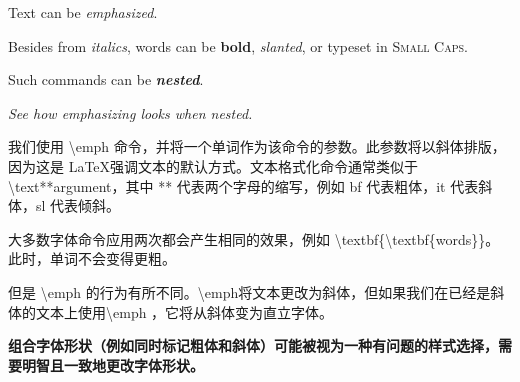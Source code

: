 \documentclass{article}
\begin{document}
Text can be \emph{emphasized}.

Besides from \textit{italics}, words can be \textbf{bold}, \textsl{slanted}, or typeset in \textsc {Small Caps}.

Such commands can be \textit{\textbf{nested}}.

\emph{See how \emph{emphasizing} looks when nested.}

我们使用 \textbackslash emph 命令，并将一个单词作为该命令的参数。此参数将以斜体排版，因为这是 \LaTeX 强调文本的默认方式。文本格式化命令通常类似于\textbackslash text**{argument}，其中 ** 代表两个字母的缩写，例如 bf 代表粗体，it 代表斜体，sl 代表倾斜。

大多数字体命令应用两次都会产生相同的效果，例如 \textbackslash textbf\{\textbackslash textbf\{words\}\}。此时，单词不会变得更粗。

但是 \textbackslash emph 的行为有所不同。\textbackslash emph将文本更改为斜体，但如果我们在已经是斜体的文本上使用\textbackslash emph ，它将从斜体变为直立字体。

\textbf{组合字体形状（例如同时标记粗体和斜体）可能被视为一种有问题的样式选择，需要明智且一致地更改字体形状。}
\end{document}
